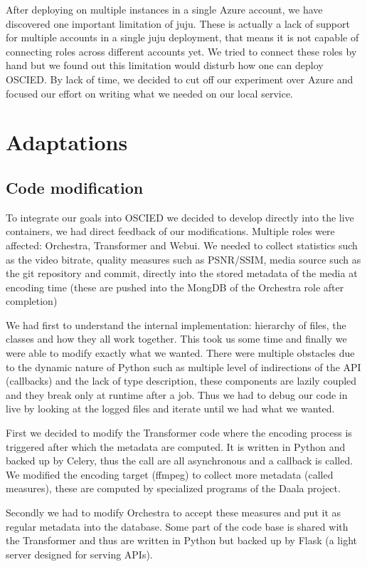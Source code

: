 \documentclass[a4paper,12pt]{article}
\begin{document}
After deploying on multiple instances in a single Azure account, we have discovered one important limitation of juju.
These is actually a lack of support for multiple accounts in a single juju deployment, that means it is not capable of connecting roles across different accounts yet.
We tried to connect these roles by hand but we found out this limitation would disturb how one can deploy OSCIED.
By lack of time, we decided to cut off our experiment over Azure and focused our effort on writing what we needed on our local service.

\section{Adaptations}

\subsection{Code modification}
To integrate our goals into OSCIED we decided to develop directly into the live containers, we had direct feedback of our modifications.
Multiple roles were affected: Orchestra, Transformer and Webui.
We needed to collect statistics such as the video bitrate, quality measures such as PSNR/SSIM, media source such as the git repository and commit, directly into the stored metadata of the media at encoding time (these are pushed into the MongDB of the Orchestra role after completion)

We had first to understand the internal implementation: hierarchy of files, the classes and how they all work together.
This took us some time and finally we were able to modify exactly what we wanted.
There were multiple obstacles due to the dynamic nature of Python such as multiple level of indirections of the API (callbacks) and the lack of type description, these components are lazily coupled and they break only at runtime after a job.
Thus we had to debug our code in live by looking at the logged files and iterate until we had what we wanted.

First we decided to modify the Transformer code where the encoding process is triggered after which the metadata are computed.
It is written in Python and backed up by Celery, thus the call are all asynchronous and a callback is called.
We modified the encoding target (ffmpeg) to collect more metadata (called
measures), these are computed by specialized programs of the Daala project.

Secondly we had to modify Orchestra to accept these measures and put it as regular metadata into the database. Some part of the code base is shared with the Transformer and thus are written in Python but backed up by Flask (a light server designed for serving APIs).
\end{document}
